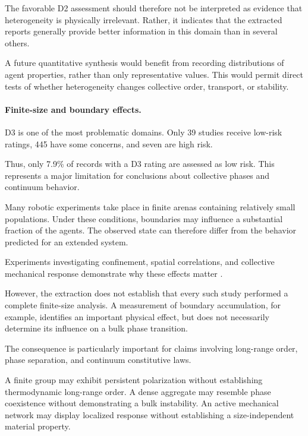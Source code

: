 The favorable D2 assessment should
therefore not be interpreted as
evidence that heterogeneity is
physically irrelevant. Rather,
it indicates that the extracted
reports generally provide
better information in this
domain than in several others.

A future quantitative synthesis
would benefit from recording
distributions of agent properties,
rather than only representative
values. This would permit direct
tests of whether heterogeneity
changes collective order,
transport, or stability.

\paragraph*{Finite-size and boundary effects.}

D3 is one of the most problematic domains.
Only 39 studies receive low-risk ratings,
445 have some concerns, and seven
are high risk.

Thus, only 7.9\% of records with a D3
rating are assessed as low risk.
This represents a major limitation
for conclusions about collective
phases and continuum behavior.

Many robotic experiments take place
in finite arenas containing
relatively small populations.
Under these conditions, boundaries
may influence a substantial
fraction of the agents.
The observed state can
therefore differ from
the behavior predicted
for an extended system.

Experiments investigating confinement,
spatial correlations, and collective
mechanical response demonstrate
why these effects matter
\cite{Deblais2018boundariescontrolc,Boudet2025effectsofboundarie,Casiulis2025ageometricconditio,Wang2025hyperuniformnetwork,Zhang2026emergentnonhermiti,Coulais2025activemetamaterials,Wagner2026geometryinducedtra}.

However, the extraction does not establish
that every such study performed a
complete finite-size analysis.
A measurement of boundary accumulation,
for example, identifies an important
physical effect, but does not
necessarily determine its influence
on a bulk phase transition.

The consequence is particularly
important for claims involving
long-range order, phase separation,
and continuum constitutive laws.

A finite group may exhibit persistent
polarization without establishing
thermodynamic long-range order.
A dense aggregate may resemble
phase coexistence without
demonstrating a bulk instability.
An active mechanical network
may display localized response
without establishing a
size-independent material property.

